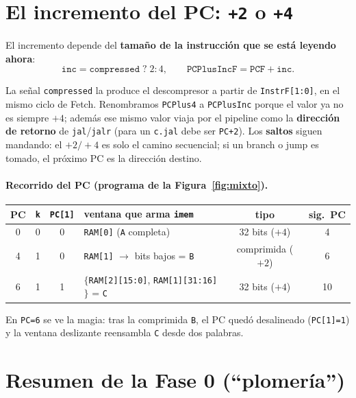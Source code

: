 \documentclass[11pt]{article}
\newcommand{\code}[1]{\texttt{#1}}
\begin{document}
\section{El incremento del PC: \texttt{+2} o \texttt{+4}}

El incremento depende del \textbf{tamaño de la instrucción que se está leyendo
ahora}:
\[
\code{inc} = \code{compressed}\;?\;2 : 4,
\qquad
\code{PCPlusIncF} = \code{PCF} + \code{inc}.
\]

La señal \code{compressed} la produce el descompresor a partir de
\code{InstrF[1:0]}, en el mismo ciclo de Fetch. Renombramos \code{PCPlus4} a
\code{PCPlusInc} porque el valor ya no es siempre $+4$; además ese mismo valor
viaja por el pipeline como la \textbf{dirección de retorno} de \code{jal}/\code{jalr}
(para un \code{c.jal} debe ser \code{PC+2}). Los \textbf{saltos} siguen mandando:
el $+2/+4$ es solo el camino secuencial; si un branch o jump es tomado, el
próximo PC es la dirección destino.

\paragraph{Recorrido del PC (programa de la Figura~\ref{fig:mixto}).}
\begin{center}
\small
\begin{tabular}{@{}cccp{6.0cm}cc@{}}
\toprule
PC & \code{k} & \code{PC[1]} & ventana que arma \code{imem} & tipo & sig.\ PC \\
\midrule
0 & 0 & 0 & \code{RAM[0]} (\code{A} completa)                          & 32 bits ($+4$) & 4 \\
4 & 1 & 0 & \code{RAM[1]} $\to$ bits bajos = \code{B}                   & comprimida ($+2$) & 6 \\
6 & 1 & 1 & $\{$\code{RAM[2][15:0]}, \code{RAM[1][31:16]}$\}$ = \code{C} & 32 bits ($+4$) & 10 \\
\bottomrule
\end{tabular}
\end{center}

\noindent
En \code{PC=6} se ve la magia: tras la comprimida \code{B}, el PC quedó
desalineado (\code{PC[1]=1}) y la ventana deslizante reensambla \code{C} desde dos
palabras.

\section{Resumen de la Fase 0 (``plomería'')}
\end{document}
